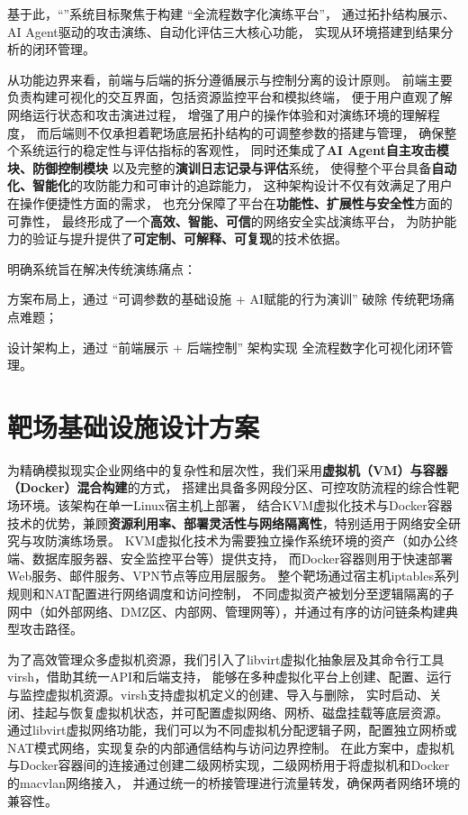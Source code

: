 \documentclass[lang=cn,10pt]{elegantbook}
\begin{document}
基于此，“”系统目标聚焦于构建 “全流程数字化演练平台”，
通过拓扑结构展示、AI Agent驱动的攻击演练、自动化评估三大核心功能，
实现从环境搭建到结果分析的闭环管理。

从功能边界来看，前端与后端的拆分遵循展示与控制分离的设计原则。
前端主要负责构建可视化的交互界面，包括资源监控平台和模拟终端，
便于用户直观了解网络运行状态和攻击演进过程，
增强了用户的操作体验和对演练环境的理解程度，
而后端则不仅承担着靶场底层拓扑结构的可调整参数的搭建与管理，
确保整个系统运行的稳定性与评估指标的客观性，
同时还集成了\textbf{AI Agent自主攻击模块、防御控制模块}
以及完整的\textbf{演训日志记录与评估}系统，
使得整个平台具备\textbf{自动化、智能化}的攻防能力和可审计的追踪能力，
这种架构设计不仅有效满足了用户在操作便捷性方面的需求，
也充分保障了平台在\textbf{功能性、扩展性与安全性}方面的可靠性，
最终形成了一个\textbf{高效、智能、可信}的网络安全实战演练平台，
为防护能力的验证与提升提供了\textbf{可定制、可解释、可复现}的技术依据。

\begin{definition}
    明确系统旨在解决传统演练痛点：

    方案布局上，通过 “可调参数的基础设施 + AI赋能的行为演训” 破除
    传统靶场痛点难题；

    设计架构上，通过 “前端展示 + 后端控制” 架构实现
    全流程数字化可视化闭环管理。
\end{definition}


\section{靶场基础设施设计方案}

为精确模拟现实企业网络中的复杂性和层次性，我们采用\textbf{虚拟机（VM）与容器（Docker）混合构建}的方式，
搭建出具备多网段分区、可控攻防流程的综合性靶场环境。该架构在单一Linux宿主机上部署，
结合KVM虚拟化技术与Docker容器技术的优势，兼顾\textbf{资源利用率、部署灵活性与网络隔离性}，特别适用于网络安全研究与攻防演练场景。
KVM虚拟化技术为需要独立操作系统环境的资产（如办公终端、数据库服务器、安全监控平台等）提供支持，
而Docker容器则用于快速部署Web服务、邮件服务、VPN节点等应用层服务。
整个靶场通过宿主机iptables系列规则和NAT配置进行网络调度和访问控制，
不同虚拟资产被划分至逻辑隔离的子网中（如外部网络、DMZ区、内部网、管理网等），并通过有序的访问链条构建典型攻击路径。

为了高效管理众多虚拟机资源，我们引入了libvirt虚拟化抽象层及其命令行工具virsh，借助其统一API和后端支持，
能够在多种虚拟化平台上创建、配置、运行与监控虚拟机资源。virsh支持虚拟机定义的创建、导入与删除，
实时启动、关闭、挂起与恢复虚拟机状态，并可配置虚拟网络、网桥、磁盘挂载等底层资源。
通过libvirt虚拟网络功能，我们可以为不同虚拟机分配逻辑子网，配置独立网桥或NAT模式网络，实现复杂的内部通信结构与访问边界控制。
在此方案中，虚拟机与Docker容器间的连接通过创建二级网桥实现，二级网桥用于将虚拟机和Docker的macvlan网络接入，
并通过统一的桥接管理进行流量转发，确保两者网络环境的兼容性。
\end{document}
